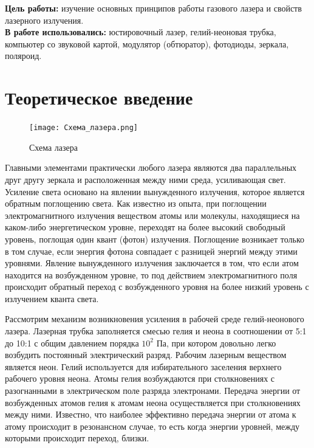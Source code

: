 


    
    
    \textbf{Цель работы:} изучение основных принципов работы газового лазера и свойств лазерного излучения. \\
    
    \textbf{В работе использовались:} юстировочный лазер, гелий-неоновая трубка, компьютер со звуковой картой, модулятор (обтюратор), фотодиоды, зеркала, поляроид. \\
    
    \section*{Теоретическое введение}
    
    \begin{figure}
    	\centering
    	\texttt{[image: Схема\_лазера.png]}
    	\caption{Схема лазера}
    	\label{image:scheme}
    \end{figure}
    
    Главными элементами практически любого лазера являются два параллельных друг другу зеркала и расположенная между ними среда, усиливающая свет. Усиление света основано на явлении вынужденного излучения, которое является обратным поглощению света. Как известно из опыта, при поглощении электромагнитного излучения веществом атомы или молекулы, находящиеся на каком-либо энергетическом уровне, переходят на более высокий свободный уровень, поглощая один квант (фотон) излучения. Поглощение возникает только в том случае, если энергия фотона совпадает с разницей энергий между этими уровнями. Явление вынужденного излучения заключается в том, что если атом находится на возбужденном уровне, то под действием электромагнитного поля происходит обратный переход с возбужденного уровня на более низкий уровень с излучением кванта света.
    
    Рассмотрим механизм возникновения усиления в рабочей среде гелий-неонового лазера. Лазерная трубка заполняется смесью гелия и неона в соотношении от 5:1 до 10:1 с общим давлением порядка $10^2$ Па, при котором довольно легко возбудить постоянный электрический разряд. Рабочим лазерным веществом является неон. Гелий используется для избирательного заселения верхнего рабочего уровня неона. Атомы гелия возбуждаются при столкновениях с разогнанными в электрическом поле разряда электронами. Передача энергии от возбужденных атомов гелия к атомам неона осуществляется при столкновениях между ними. Известно, что наиболее эффективно передача энергии от атома к атому происходит в резонансном случае, то есть когда энергии уровней, между которыми происходит переход, близки.
    
